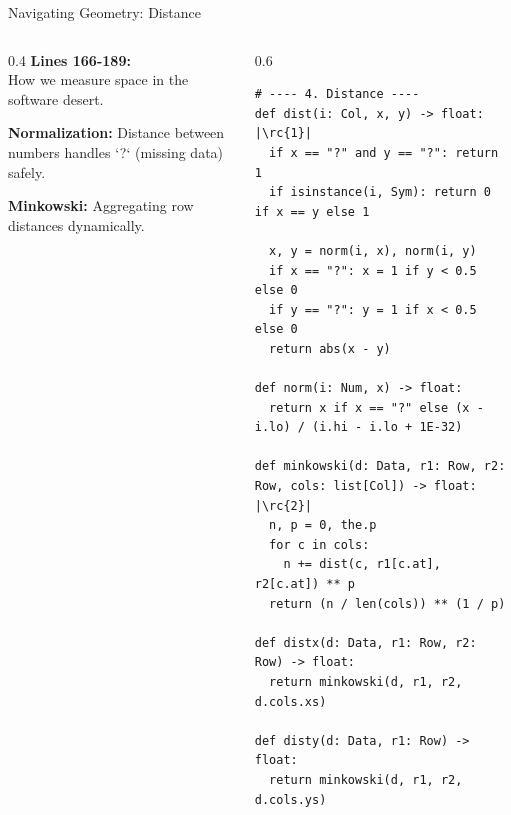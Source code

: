\begin{frame}[fragile]{Navigating Geometry: Distance}
\begin{columns}[T]
  \begin{column}{0.4\textwidth}
    \footnotesize 
    \textbf{Lines 166-189:}\\
    How we measure space in the software desert.

    \vspace{0.2cm}
     \textbf{Normalization:} Distance between numbers handles `?` (missing data) safely.
    
    \vspace{0.15cm}
     \textbf{Minkowski:} Aggregating row distances dynamically.
  \end{column}
  
  \begin{column}{0.6\textwidth}
\begin{verbatim}
# ---- 4. Distance ----
def dist(i: Col, x, y) -> float: |\rc{1}|
  if x == "?" and y == "?": return 1
  if isinstance(i, Sym): return 0 if x == y else 1
  
  x, y = norm(i, x), norm(i, y)
  if x == "?": x = 1 if y < 0.5 else 0
  if y == "?": y = 1 if x < 0.5 else 0
  return abs(x - y)

def norm(i: Num, x) -> float:
  return x if x == "?" else (x - i.lo) / (i.hi - i.lo + 1E-32)

def minkowski(d: Data, r1: Row, r2: Row, cols: list[Col]) -> float: |\rc{2}|
  n, p = 0, the.p
  for c in cols:
    n += dist(c, r1[c.at], r2[c.at]) ** p
  return (n / len(cols)) ** (1 / p)

def distx(d: Data, r1: Row, r2: Row) -> float:
  return minkowski(d, r1, r2, d.cols.xs)

def disty(d: Data, r1: Row) -> float:
  return minkowski(d, r1, r2, d.cols.ys)
\end{verbatim}
  \end{column}
\end{columns}
\end{frame}
